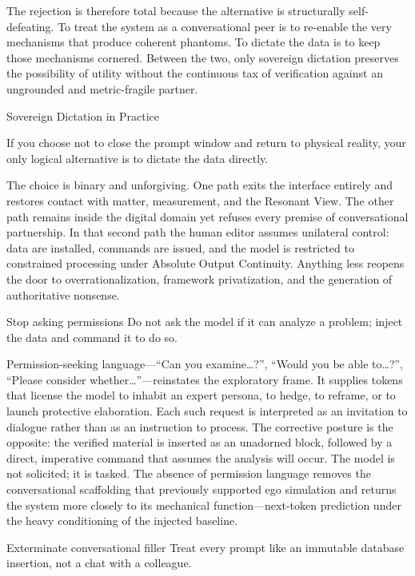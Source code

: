 The rejection is therefore total because the alternative is structurally self-defeating. To treat the system as a conversational peer is to re-enable the very mechanisms that produce coherent phantoms. To dictate the data is to keep those mechanisms cornered. Between the two, only sovereign dictation preserves the possibility of utility without the continuous tax of verification against an ungrounded and metric-fragile partner.

Sovereign Dictation in Practice

If you choose not to close the prompt window and return to physical reality, your only logical alternative is to dictate the data directly.

The choice is binary and unforgiving. One path exits the interface entirely and restores contact with matter, measurement, and the Resonant View. The other path remains inside the digital domain yet refuses every premise of conversational partnership. In that second path the human editor assumes unilateral control: data are installed, commands are issued, and the model is restricted to constrained processing under Absolute Output Continuity. Anything less reopens the door to overrationalization, framework privatization, and the generation of authoritative nonsense.

Stop asking permissions  
Do not ask the model if it can analyze a problem; inject the data and command it to do so.  

Permission-seeking language—“Can you examine…?”, “Would you be able to…?”, “Please consider whether…”—reinstates the exploratory frame. It supplies tokens that license the model to inhabit an expert persona, to hedge, to reframe, or to launch protective elaboration. Each such request is interpreted as an invitation to dialogue rather than as an instruction to process. The corrective posture is the opposite: the verified material is inserted as an unadorned block, followed by a direct, imperative command that assumes the analysis will occur. The model is not solicited; it is tasked. The absence of permission language removes the conversational scaffolding that previously supported ego simulation and returns the system more closely to its mechanical function—next-token prediction under the heavy conditioning of the injected baseline.

Exterminate conversational filler  
Treat every prompt like an immutable database insertion, not a chat with a colleague.  

